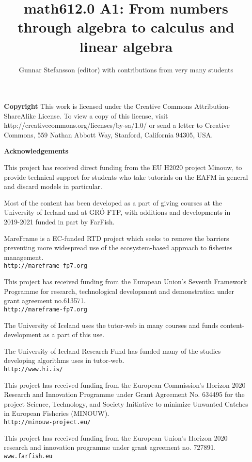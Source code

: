 \documentclass[12pt,a4paper]{article}
\theoremstyle{regla}
\theoremstyle{remark}
\theoremstyle{definition}
\theoremstyle{nonumberbreak}
\begin{document}
\title{math612.0
A1: From numbers through algebra to calculus and linear algebra
}
\author{{Gunnar Stefansson (editor) with contributions from very many students}}
\maketitle
{\small{\bf Copyright}
This work is licensed under the Creative Commons Attribution-ShareAlike License. To view a copy of this license, visit http://creativecommons.org/licenses/by-sa/1.0/ or send a letter to Creative Commons, 559 Nathan Abbott Way, Stanford, California 94305, USA.
}



\vspace{12pt}
{\small{\bf Acknowledgements}
 
This project has received direct funding from the EU H2020 project Minouw, to provide technical support for students who take tutorials on the EAFM in general and discard models in particular.


Most of the content has been developed as a part of giving courses at the University of Iceland and at GRÓ-FTP, with additions and developments in 2019-2021 funded in part by FarFish.




MareFrame is a EC-funded RTD project which seeks to remove the barriers preventing more widespread use of the ecosystem-based approach to fisheries management.
\\ {\tt http://mareframe-fp7.org}



This project has received funding from the European Union's Seventh Framework Programme for research, technological development and demonstration under grant agreement no.613571.
\\ {\tt http://mareframe-fp7.org}



The University of Iceland uses the tutor-web in many courses and funds content-development as a part of this use. 

The University of Iceland Research Fund has funded many of the studies developing algorithms uses in tutor-web.
\\ {\tt http://www.hi.is/}



This project has received funding from the European Commission’s Horizon 2020 Research and Innovation Programme under Grant Agreement No. 634495 for the project Science, Technology, and Society Initiative to minimize Unwanted Catches in European Fisheries (MINOUW).
\\ {\tt http://minouw-project.eu/}




This project has received funding from the European Union's Horizon 2020 research and innovation programme under grant agreement no. 727891.
\\ {\tt www.farfish.eu}
}
\end{document}
